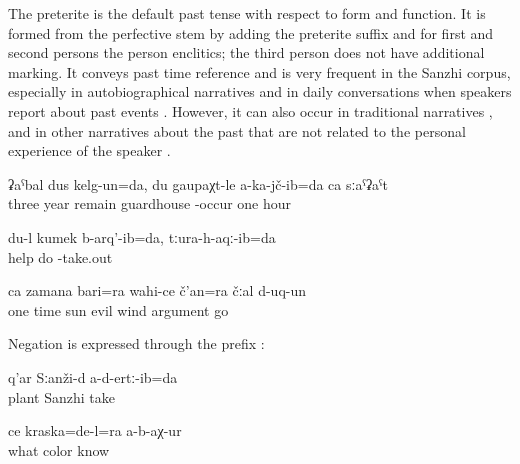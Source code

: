 The preterite is the default past tense with respect to form and function. It is formed from the perfective stem by adding the preterite suffix and for first and second persons the person enclitics; the third person does not have additional marking. It conveys past time reference and is very frequent in the Sanzhi corpus, especially in autobiographical narratives  and in daily conversations when speakers report about past events . However, it can also occur in traditional narratives ,  and in other narratives about the past that are not related to the personal experience of the speaker .
%
\begin{exe}

	\ex	\label{ex:Three years I remained, I was not one single hour at the guardhouse}
	\gll	ʡaˁbal	dus	kelg-un=da,		du	gaupaχt-le	a-ka-jč-ib=da	ca	sːaˁʡaˁt\\
		three	year	remain			guardhouse	-occur	one	hour\\
	\glt	{}

\ex	\label{ex:I helped. I pulled him out}
	\gll	du-l	kumek	b-arq'-ib=da,	tːura-h-aqː-ib=da\\
			help	do	-take.out\\
	\glt	{}
	
	\ex	\label{ex:Once upon a time the sun and the evil wind argued analytic}
	\gll	ca	zamana	bari=ra	wahi-ce	č'an=ra	čːal	d-uq-un\\
		one	time	sun	evil	wind	argument	go\\
	\glt	{}
\end{exe}

Negation is expressed through the prefix :
%
\begin{exe}
	\ex	\label{ex:We did not gather plants in Sanzhi}
	\gll	q'ar	Sːanži-d	a-d-ertː-ib=da\\
		plant	Sanzhi	take\\
	\glt	{}

	\ex	\label{ex:Nobody found out what colour this is}
	\gll	ce	kraska=de-l=ra	a-b-aχ-ur\\
		what	color	know\\
	\glt	{}
\end{exe}


